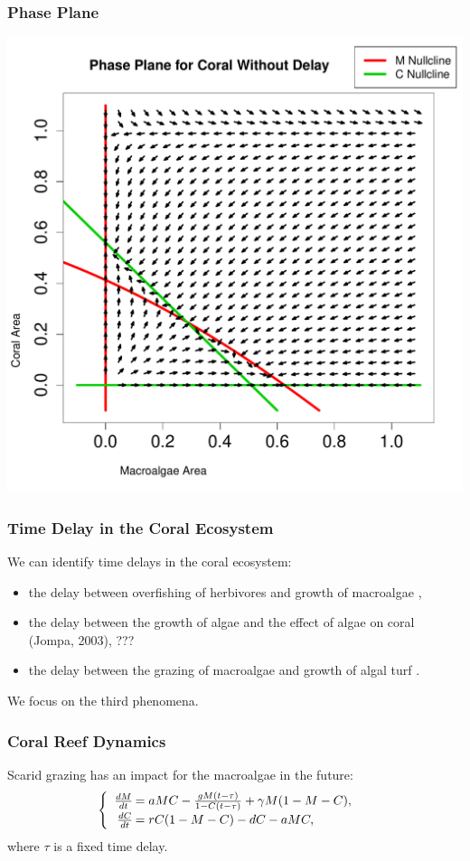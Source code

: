 \begin{frame}\frametitle{Phase Plane} 

  \includegraphics[scale=.325]{./nullclines.pdf}

\end{frame}



\begin{frame}
\frametitle{Time Delay in the Coral Ecosystem}

We can identify time delays in the coral ecosystem:
\begin{itemize}
\item the delay between overfishing of herbivores and growth of
  macroalgae \cite{Dinsdale},
\item the delay between the growth of algae and the effect of algae on
  coral (Jompa, 2003), \cite{Mumby} ???
\item the delay between the grazing of macroalgae and growth of algal
  turf \cite{Hastings}.
\end{itemize} We focus on the third phenomena.

\end{frame}


\begin{frame}\frametitle{Coral Reef Dynamics}
Scarid grazing has an impact for the macroalgae in the future:
$$\begin{cases}
  \begin{array}{rl}
    \frac{dM}{dt}\hspace{-.8em}&=aMC - \frac{gM(t-\tau)}{1-C(t-\tau)} + \gamma M (1-M-C),\\
    \frac{dC}{dt}\hspace{-.8em}&=rC(1-M-C) - dC - aMC,\\
  \end{array}
\end{cases}$$ where $\tau$ is a fixed time delay.
\end{frame}


